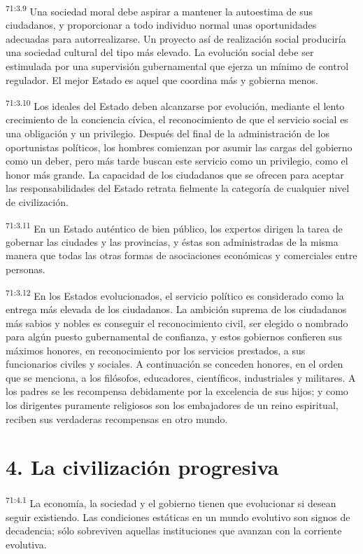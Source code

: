 \par
\textsuperscript{71:3.9} Una sociedad moral debe aspirar a mantener la autoestima de sus ciudadanos, y proporcionar a todo individuo normal unas oportunidades adecuadas para autorrealizarse. Un proyecto así de realización social produciría una sociedad cultural del tipo más elevado. La evolución social debe ser estimulada por una supervisión gubernamental que ejerza un mínimo de control regulador. El mejor Estado es aquel que coordina más y gobierna menos.

\par
\textsuperscript{71:3.10} Los ideales del Estado deben alcanzarse por evolución, mediante el lento crecimiento de la conciencia cívica, el reconocimiento de que el servicio social es una obligación y un privilegio. Después del final de la administración de los oportunistas políticos, los hombres comienzan por asumir las cargas del gobierno como un deber, pero más tarde buscan este servicio como un privilegio, como el honor más grande. La capacidad de los ciudadanos que se ofrecen para aceptar las responsabilidades del Estado retrata fielmente la categoría de cualquier nivel de civilización.

\par
\textsuperscript{71:3.11} En un Estado auténtico de bien público, los expertos dirigen la tarea de gobernar las ciudades y las provincias, y éstas son administradas de la misma manera que todas las otras formas de asociaciones económicas y comerciales entre personas.

\par
\textsuperscript{71:3.12} En los Estados evolucionados, el servicio político es considerado como la entrega más elevada de los ciudadanos. La ambición suprema de los ciudadanos más sabios y nobles es conseguir el reconocimiento civil, ser elegido o nombrado para algún puesto gubernamental de confianza, y estos gobiernos confieren sus máximos honores, en reconocimiento por los servicios prestados, a sus funcionarios civiles y sociales. A continuación se conceden honores, en el orden que se menciona, a los filósofos, educadores, científicos, industriales y militares. A los padres se les recompensa debidamente por la excelencia de sus hijos; y como los dirigentes puramente religiosos son los embajadores de un reino espiritual, reciben sus verdaderas recompensas en otro mundo.

\section*{4. La civilización progresiva}
\par
\textsuperscript{71:4.1} La economía, la sociedad y el gobierno tienen que evolucionar si desean seguir existiendo. Las condiciones estáticas en un mundo evolutivo son signos de decadencia; sólo sobreviven aquellas instituciones que avanzan con la corriente evolutiva.

